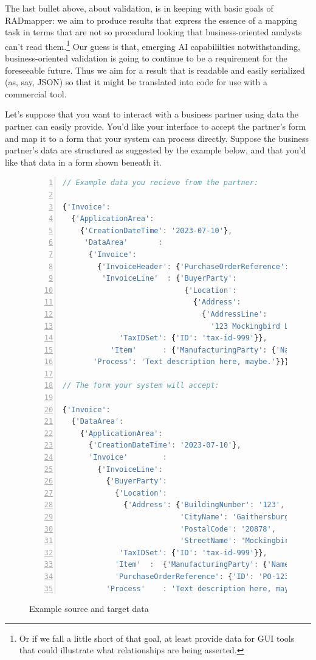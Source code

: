 \documentclass[10pt,letterpaper]{article} %
\begin{document}
The last bullet above, about validation, is in keeping with basic goals of RADmapper: we aim to produce results that express the essence of a mapping task in terms that are not so procedural looking that business-oriented analysts can't read them.\footnote{Or if we fall a little short of that goal, at least provide data for GUI tools that could illustrate what relationships are being asserted.}
Our guess is that, emerging AI capabililties notwithstanding, business-oriented validation is going to continue to be a requirement for the foreseeable future.
Thus we aim for a result that is readable and easily serialized (as, say, JSON) so that it might be translated into code for use with a commercial tool.

Let's suppose that you want to interact with a business partner using data the partner can easily provide.
You'd like your interface to accept the partner's form and map it to a form that your system can process directly.
Suppose the business partner's data are structured as suggested by the example below, and that you'd like that data in a form shown beneath it.

\begin{figure}[H]
  \caption{Example source and target data}
  \label{fig:data-for-end-to-end}
\begin{lstlisting}[language=JavaScript,numberstyle=\scriptsize,basicstyle=\ttfamily\scriptsize,numbers=left,stepnumber=1,breaklines=true]
// Example data you recieve from the partner:

{'Invoice':
  {'ApplicationArea':
    {'CreationDateTime': '2023-07-10'},
     'DataArea'       :
      {'Invoice':
        {'InvoiceHeader': {'PurchaseOrderReference': {'ID': 'PO-1234'}},
         'InvoiceLine'  : {'BuyerParty':
                            {'Location':
                              {'Address':
                                {'AddressLine':
                                  '123 Mockingbird Lane, Gaithersburg MD, 20878'}},
             'TaxIDSet': {'ID': 'tax-id-999'}},
           'Item'      : {'ManufacturingParty': {'Name': 'Acme Widget'}}}},
       'Process': 'Text description here, maybe.'}}}

// The form your system will accept:

{'Invoice':
  {'DataArea':
    {'ApplicationArea':
      {'CreationDateTime': '2023-07-10'},
      'Invoice'        :
        {'InvoiceLine':
          {'BuyerParty':
            {'Location':
              {'Address': {'BuildingNumber': '123',
                           'CityName': 'Gaithersburg',
                           'PostalCode': '20878',
                           'StreetName': 'Mockingbird Lane'}},
             'TaxIDSet': {'ID': 'tax-id-999'}},
            'Item'  :  {'ManufacturingParty': {'Name': 'Acme Widget'}},
            'PurchaseOrderReference': {'ID': 'PO-1234'}},
          'Process'    : 'Text description here, maybe.'}}}}
\end{lstlisting}
\end{figure}
\end{document}
